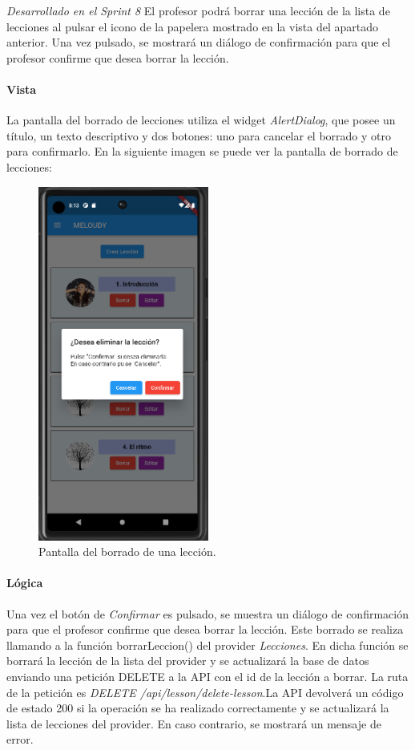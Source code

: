 \textit{Desarrollado en el Sprint 8}
El profesor podrá borrar una lección de la lista de lecciones al pulsar el icono de la papelera mostrado en la vista del apartado anterior. Una vez pulsado, se mostrará un diálogo de confirmación para que el profesor confirme que desea borrar la lección.

\paragraph*{Vista}
La pantalla del borrado de lecciones utiliza el widget \textit{AlertDialog}, que posee
un título, un texto descriptivo y dos botones: uno para cancelar el borrado y otro para confirmarlo.
En la siguiente imagen se puede ver la pantalla de borrado de lecciones:


\begin{figure}[H]
  \centering
  \includegraphics[width=0.5\textwidth]{imagenes/c7/borrarleccion.png}
  \caption{Pantalla del borrado de una lección.} 
  \label{fig:borradoleccion}
\end{figure}

\paragraph*{Lógica}
Una vez el botón de \textit{Confirmar} es pulsado, se muestra un diálogo de confirmación para que el profesor confirme que desea borrar la lección.
Este borrado se realiza llamando a la función borrarLeccion() del provider \textit{Lecciones}. En dicha función se borrará la lección de la lista del provider y se actualizará la base de datos enviando
una petición DELETE a la API con el id de la lección a borrar. La ruta de la petición es \textit{DELETE /api/lesson/delete-lesson}.La API devolverá un código de estado 200 si la operación se ha realizado correctamente y se actualizará la lista de lecciones del provider. En caso contrario, se mostrará un mensaje de error.


